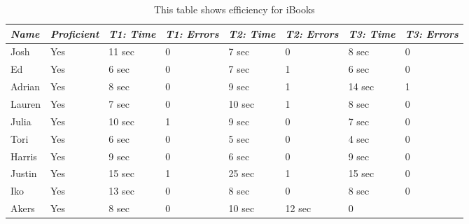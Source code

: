 \documentclass[12pt,letterpaper]{article}
\begin{document}
    \begin{table}
        \centering
        \begin{tabular}{|l|l|l|l|l|l|l|l|}
            \hline
            \emph{Name} & \emph{Proficient} & \emph{T1: Time} & \emph{T1: Errors} & \emph{T2: Time} & \emph{T2: Errors} & \emph{T3: Time} & \emph{T3: Errors} \\
            \hline
            Josh & Yes & 11 sec & 0 & 7 sec & 0 & 8 sec & 0 \\
            \hline
            Ed & Yes & 6 sec & 0 & 7 sec & 1 & 6 sec & 0 \\
            \hline
            Adrian & Yes & 8 sec & 0 & 9 sec & 1 & 14 sec & 1 \\
            \hline
            Lauren & Yes & 7 sec & 0 & 10 sec & 1 & 8 sec & 0 \\
            \hline
            Julia & Yes & 10 sec & 1 & 9 sec & 0 & 7 sec & 0 \\
            \hline
            Tori & Yes & 6 sec & 0 & 5 sec & 0 & 4 sec & 0 \\
            \hline
            Harris & Yes & 9 sec & 0 & 6 sec & 0 & 9 sec & 0 \\
            \hline
            Justin & Yes & 15 sec & 1 & 25 sec & 1 & 15 sec & 0 \\
            \hline
            Iko & Yes & 13 sec & 0 & 8 sec & 0 & 8 sec & 0 \\
            \hline
            Akers & Yes & 8 sec & 0 & 10 sec & 12 sec & 0 \\
        \end{tabular}
        \caption{This table shows efficiency for iBooks}
    \end{table}
\end{document}
